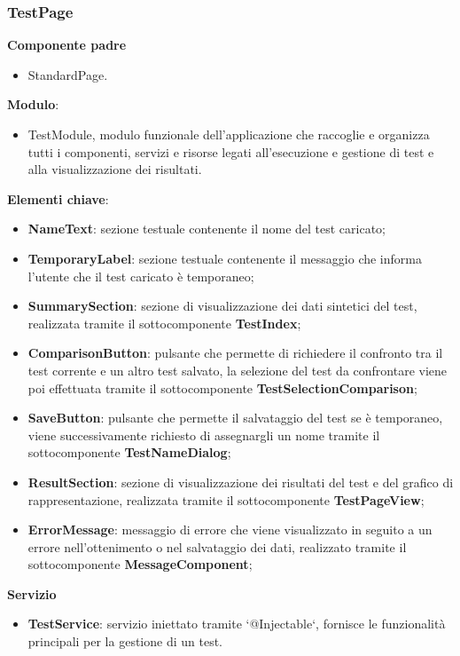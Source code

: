 \subsubsection{TestPage}
\textbf{Componente padre}
\begin{itemize}
    \item StandardPage.
\end{itemize}
\textbf{Modulo}:
\begin{itemize}
    \item TestModule, modulo funzionale dell'applicazione che raccoglie e organizza tutti i componenti, servizi e risorse legati all'esecuzione e gestione di test e alla visualizzazione dei risultati.    
\end{itemize}
\textbf{Elementi chiave}:
\begin{itemize}
    \item \textbf{NameText}: sezione testuale contenente il nome del test caricato;
    \item \textbf{TemporaryLabel}: sezione testuale contenente il messaggio che informa l'utente che il test caricato è temporaneo;
    \item \textbf{SummarySection}: sezione di visualizzazione dei dati sintetici del test, realizzata tramite il sottocomponente \textbf{TestIndex};
    \item \textbf{ComparisonButton}: pulsante che permette di richiedere il confronto tra il test corrente e un altro test salvato, la selezione del test da confrontare viene poi effettuata tramite il sottocomponente \textbf{TestSelectionComparison};
    \item \textbf{SaveButton}: pulsante che permette il salvataggio del test se è temporaneo, viene successivamente richiesto di assegnargli un nome tramite il sottocomponente \textbf{TestNameDialog};
    \item \textbf{ResultSection}: sezione di visualizzazione dei risultati del test e del grafico di rappresentazione, realizzata tramite il sottocomponente \textbf{TestPageView};
    \item \textbf{ErrorMessage}: messaggio di errore che viene visualizzato in seguito a un errore nell'ottenimento o nel salvataggio dei dati, realizzato tramite il sottocomponente \textbf{MessageComponent};
\end{itemize}
\textbf{Servizio}
\begin{itemize}
    \item \textbf{TestService}: servizio iniettato tramite `@Injectable`, fornisce le funzionalità principali per la gestione di un test.
\end{itemize}
